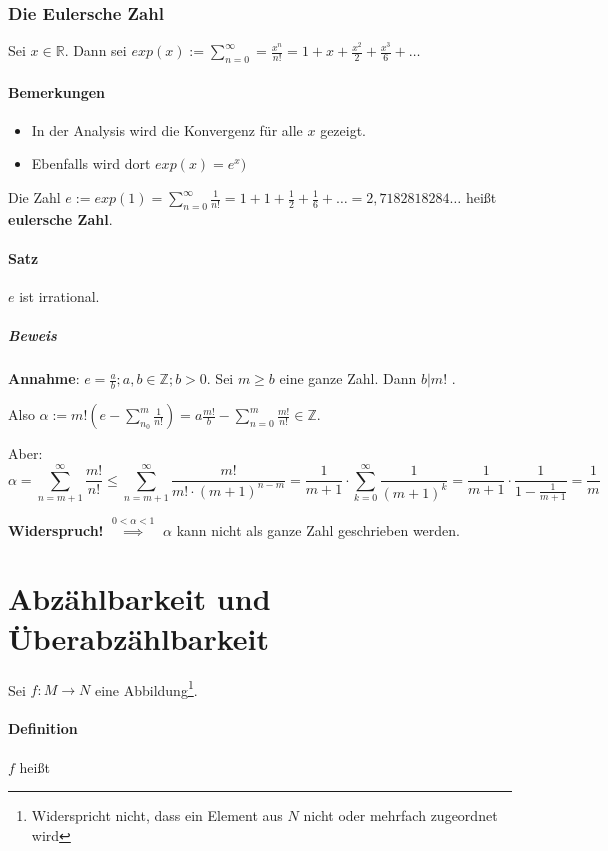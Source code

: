 \documentclass[14pt,a4paper]{article}
\newcommand{\Z}{\ensuremath{\mathbb{Z}}}
\begin{document}
  \subsubsection{Die Eulersche Zahl}
  Sei $ x \in \mathbb{R}$.
  Dann sei $ exp(x) := \sum_{n=0}^{\infty} = \frac{x^n}{n!} = 1 + x +
  \frac{x^2}{2} + \frac{x^3}{6} + \ldots $

  \paragraph{Bemerkungen}
  \begin{itemize}
    \item In der Analysis wird die Konvergenz für alle $x$ gezeigt.
    \item Ebenfalls wird dort $ exp(x) = e^x)$
  \end{itemize}

  Die Zahl $e := exp(1) = \sum_{n = 0}^\infty \frac{1}{n!} = 1 + 1 + \frac{1}{2}
  + \frac{1}{6} + \ldots = 2,7182818284\ldots$ heißt \textbf{eulersche Zahl}.

  \paragraph{Satz}
  $e$ ist irrational.

  \subparagraph{Beweis}
  \textbf{Annahme}:
  $ e = \frac{a}{b} ; a,b \in \Z ; b > 0 $.
  Sei $ m \geq b $ eine ganze Zahl. Dann $ b | m!$ .

  Also $ \alpha := m! (e - \sum_{n_0}^{m} \frac{1}{n!}) = a \frac{m!}{b} -
  \sum_{n=0}^m \frac{m!}{n!} \in \Z$.

  Aber:
  $$\alpha = \sum_{n=m+1}^{\infty} \frac{m!}{n!} \leq \sum_{n=m+1}^{\infty}
  \frac{m!}{m! \cdot (m+1)^{n-m}} = \frac{1}{m+1} \cdot \sum_{k=0}^{\infty}
  \frac{1}{(m+1)^k} = \frac{1}{m+1} \cdot \frac{1}{1 - \frac{1}{m+1}} =
  \frac{1}{m}$$

  \textbf{Widerspruch!} $\stackrel{0 < \alpha < 1}{\implies}$ $\alpha$ kann
  nicht als ganze Zahl geschrieben werden. 


  \section{Abzählbarkeit und Überabzählbarkeit}

  Sei $ f : M \to N $ eine Abbildung\footnote{Widerspricht nicht, dass ein
    Element aus $N$ nicht oder mehrfach zugeordnet wird}.

  \paragraph{Definition}
  $f$ heißt
\end{document}
